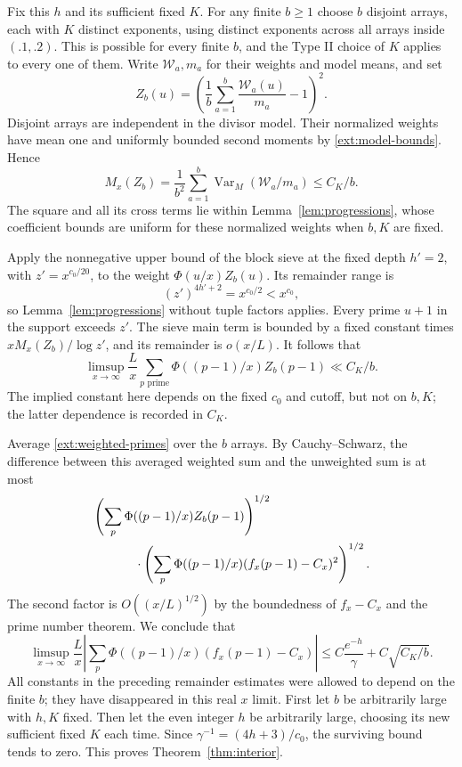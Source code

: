 Fix this $h$ and its sufficient fixed $K$.  For any finite
$b\geq1$ choose $b$ disjoint arrays, each with $K$ distinct
exponents, using distinct exponents across all arrays inside
$(.1,.2)$.  This is possible for every finite $b$, and the
Type II choice of $K$ applies to every one of them.  Write
$\mathcal W_a,m_a$ for their weights and model means, and set
\begin{equation}\label{ext:deweight-square}
 Z_b(u)=\left(\frac1b\sum_{a=1}^b
                     \frac{\mathcal W_a(u)}{m_a}-1\right)^2.
\end{equation}
Disjoint arrays are independent in the divisor model.  Their
normalized weights have mean one and uniformly bounded second
moments by \eqref{ext:model-bounds}.  Hence
\begin{equation}\label{ext:deweight-model}
 M_x(Z_b)=\frac1{b^2}\sum_{a=1}^b
               \operatorname{Var}_M(\mathcal W_a/m_a)
           \leq C_K/b.
\end{equation}
The square and all its cross terms lie within
Lemma~\ref{lem:progressions}, whose coefficient bounds are
uniform for these normalized weights when $b,K$ are fixed.

Apply the nonnegative upper bound of the block sieve at the
fixed depth $h'=2$, with $z'=x^{c_0/20}$, to the weight
$\Phi(u/x)Z_b(u)$.  Its remainder range is
\[
 (z')^{4h'+2}=x^{c_0/2}<x^{c_0},
\]
so Lemma~\ref{lem:progressions} without tuple factors applies.
Every prime $u+1$ in the support exceeds $z'$.  The sieve main
term is bounded by a fixed constant times
$xM_x(Z_b)/\log z'$, and its remainder is $o(x/L)$.
It follows that
\begin{equation}\label{ext:prime-deweight-square}
 \limsup_{x\to\infty}\frac Lx
     \sum_{p\text{ prime}}\Phi((p-1)/x)Z_b(p-1)
     \ll C_K/b.
\end{equation}
The implied constant here depends on the fixed $c_0$ and cutoff,
but not on $b,K$; the latter dependence is recorded in $C_K$.

Average \eqref{ext:weighted-primes} over the $b$ arrays.  By
Cauchy--Schwarz, the difference between this averaged weighted
sum and the unweighted sum is at most
\begin{align*}
 &\left(\sum_p\Phi((p-1)/x)Z_b(p-1)\right)^{1/2}\\
 &\hspace{12mm}\cdot
 \left(\sum_p\Phi((p-1)/x)(f_x(p-1)-C_x)^2\right)^{1/2}.
\end{align*}
The second factor is $O((x/L)^{1/2})$ by the boundedness of
$f_x-C_x$ and the prime number theorem.  We conclude that
\begin{equation}\label{ext:final-limsup}
 \limsup_{x\to\infty}\frac Lx
 \left|\sum_p\Phi((p-1)/x)(f_x(p-1)-C_x)\right|
 \leq C\frac{e^{-h}}\gamma+C\sqrt{C_K/b}.
\end{equation}
All constants in the preceding remainder estimates were allowed
to depend on the finite $b$; they have disappeared in this real
$x$ limit.  First let $b$ be arbitrarily large with $h,K$ fixed.
Then let the even integer $h$ be arbitrarily large, choosing its
new sufficient fixed $K$ each time.  Since
$\gamma^{-1}=(4h+3)/c_0$, the surviving bound tends to zero.
This proves Theorem~\ref{thm:interior}.


